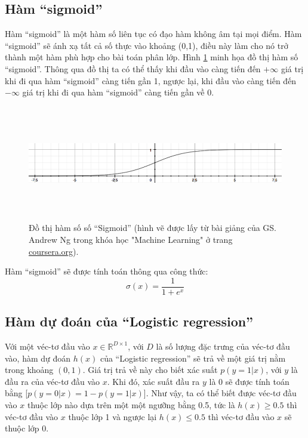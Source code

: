 \subsection{Hàm ``sigmoid''}
Hàm ``sigmoid'' là một hàm số liên tục có đạo hàm không âm tại mọi điểm. Hàm ``sigmoid'' sẽ ánh xạ tất cả số thực vào khoảng (0,1), điều này làm cho nó trở thành một hàm phù hợp cho bài toán phân lớp. Hình \ref{fig:2.2_sigmoid} minh họa đồ thị hàm số ``sigmoid''. Thông qua đồ thị ta có thể thấy khi đầu vào càng tiến đến $+\infty$ giá trị khi đi qua hàm ``sigmoid'' càng tiến gần 1, ngược lại, khi đầu vào càng tiến đến $-\infty$ giá trị khi đi qua hàm ``sigmoid'' càng tiến gần về 0.
\begin{figure}[h]
    \centering
    \includegraphics[width=\textwidth, height=5cm]{images/Chapter2/sigmoid.png}
    \caption{Đồ thị hàm số số ``Sigmoid'' (hình vẽ được lấy từ bài giảng của GS. Andrew Ng trong khóa học "Machine Learning" ở trang \href{https://www.coursera.org/learn/machine-learning}{coursera.org}).}
    \label{fig:2.2_sigmoid}
\end{figure}

Hàm ``sigmoid'' sẽ được tính toán thông qua công thức:
\begin{equation}
    \sigma(x) = \frac{1}{1+ e^{x}}
    \label{eq:2.2_sigmoid}
\end{equation}

\subsection{Hàm dự đoán của ``Logistic regression''}
Với một véc-tơ đầu vào $x \in \mathbb{R}^{D\times 1}$, với $D$ là số lượng đặc trưng của véc-tơ đầu vào, hàm dự đoán $h(x)$ của ``Logistic regression'' sẽ trả về một giá trị nằm trong khoảng $(0,1)$. Giá trị trả về này cho biết xác suất $p(y=1|x)$, với $y$ là đầu ra của véc-tơ đầu vào $x$. Khi đó, xác suất đầu ra $y$ là 0 sẽ được tính toán bằng [$p(y=0|x) = 1 - p(y=1|x)$]. Như vậy, ta có thể biết được véc-tơ đầu vào $x$ thuộc lớp nào dựa trên một một ngưỡng bằng 0.5, tức là $h(x) \geq 0.5$ thì véc-tơ đầu vào $x$ thuộc lớp 1 và ngược lại $h(x) \leq 0.5$ thì véc-tơ đầu vào $x$ sẽ thuộc lớp 0.


